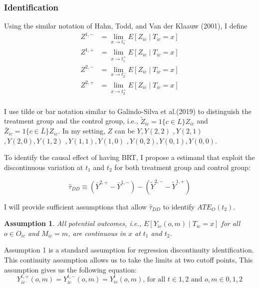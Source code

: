 \documentclass[12pt]{article}
\newtheorem{assumption}{Assumption}[section]
\begin{document}
\subsubsection{Identification}
Using the similar notation of Hahn, Todd, and Van der Klaauw (2001), I define 
\begin{equation}
    \begin{split}
        Z^{1,-} &=\lim _{x \rightarrow t^{-}_1} E\left[Z_{i c} \mid T_{i c}=x\right]\\
        Z^{1,+} &=\lim _{x \rightarrow t^{+}_1} E\left[Z_{i c} \mid T_{i c}=x\right]\\
        Z^{2,-} &=\lim _{x \rightarrow t^{-}_2} E\left[Z_{i c} \mid T_{i c}=x\right]\\
        Z^{2,+} &=\lim _{x \rightarrow t^{+}_2} E\left[Z_{i c} \mid T_{i c}=x\right]\\
    \end{split}
\end{equation}

I use tilde or bar notation similar to Galindo-Silva et al.(2019) to distinguish the treatment group and the control group, i.e., $\tilde{Z}_{i c}=1\{c \in L\} Z_{i c}$ and $\bar{Z}_{i c}=1\{c \in \bar{L}\} Z_{i c}$. In my setting, $Z$ can be $Y,Y(2,2)$ $, Y(2,1)$ $, Y(2,0), Y(1,2)$ $, Y(1,1), Y(1,0)$ $, Y(0,2),Y(0,1), Y(0,0)$.

To identify the causal effect of having BRT, I propose a estimand that exploit the discontinuous variation at $t_1$ and $t_2$ for both treatment group and control group:

\begin{equation}
    \hat{\tau}_{D D} \equiv\left(\bar{Y}^{2,+}-\bar{Y}^{1,-}\right)-\left(\tilde{Y}^{2,-}-\tilde{Y}^{1,+}\right)
\end{equation}

I will provide sufficient assumptions that allow $\hat{\tau}_{D D}$ to identify $A T E_{O}(t_2)$.\\



\begin{assumption}
All potential outcomes, i.e., $E\left[Y_{ic}(o, m) \mid T_{i c}=x\right]$ for all $o \in O_{i c}$ and $M_{i c}=m$, are continuous in $x$ at $t_1$ and $t_2$.
\end{assumption}




Assumption 1 is a standard assumption for regression discontinuity identification. This continuity assumption allows us to take the limits at two cutoff points, This assumption gives us the following equation:
\begin{equation}
Y^{t,+}_{ic}(o,m) = Y^{t,-}_{ic}(o,m) = Y^{t}_{ic}(o,m) \text{, for all } t\in {1,2} \text{ and } o,m\in {0,1,2}
\end{equation}
\end{document}
